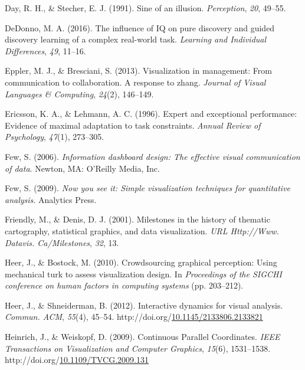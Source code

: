 \documentclass[print]{nuthesis}
\newlength{\cslhangindent}
\newenvironment{CSLReferences}[2]%
{\setlength{\parindent}{0pt}%
\everypar{\setlength{\hangindent}{\cslhangindent}}\ignorespaces}%
{\par}
\begin{document}
\begin{CSLReferences}{1}{0}
\leavevmode{}%
Day, R. H., \& Stecher, E. J. (1991). Sine of an illusion. \emph{Perception}, \emph{20}, 49--55.

\leavevmode{}%
DeDonno, M. A. (2016). The influence of IQ on pure discovery and guided discovery learning of a complex real-world task. \emph{Learning and Individual Differences}, \emph{49}, 11--16.

\leavevmode{}%
Eppler, M. J., \& Bresciani, S. (2013). Visualization in management: From communication to collaboration. A response to zhang. \emph{Journal of Visual Languages \& Computing}, \emph{24}(2), 146--149.

\leavevmode{}%
Ericsson, K. A., \& Lehmann, A. C. (1996). Expert and exceptional performance: Evidence of maximal adaptation to task constraints. \emph{Annual Review of Psychology}, \emph{47}(1), 273--305.

\leavevmode{}%
Few, S. (2006). \emph{Information dashboard design: The effective visual communication of data}. Newton, MA: O'Reilly Media, Inc.

\leavevmode{}%
Few, S. (2009). \emph{Now you see it: Simple visualization techniques for quantitative analysis}. Analytics Press.

\leavevmode{}%
Friendly, M., \& Denis, D. J. (2001). Milestones in the history of thematic cartography, statistical graphics, and data visualization. \emph{URL Http://Www. Datavis. Ca/Milestones}, \emph{32}, 13.

\leavevmode{}%
Heer, J., \& Bostock, M. (2010). Crowdsourcing graphical perception: Using mechanical turk to assess visualization design. In \emph{Proceedings of the SIGCHI conference on human factors in computing systems} (pp. 203--212).

\leavevmode{}%
Heer, J., \& Shneiderman, B. (2012). Interactive dynamics for visual analysis. \emph{Commun. ACM}, \emph{55}(4), 45--54. http://doi.org/\href{https://doi.org/10.1145/2133806.2133821}{10.1145/2133806.2133821}

\leavevmode{}%
Heinrich, J., \& Weiskopf, D. (2009). {Continuous Parallel Coordinates}. \emph{IEEE Transactions on Visualization and Computer Graphics}, \emph{15}(6), 1531--1538. http://doi.org/\href{https://doi.org/10.1109/TVCG.2009.131}{10.1109/TVCG.2009.131}


\end{CSLReferences}
\end{document}
